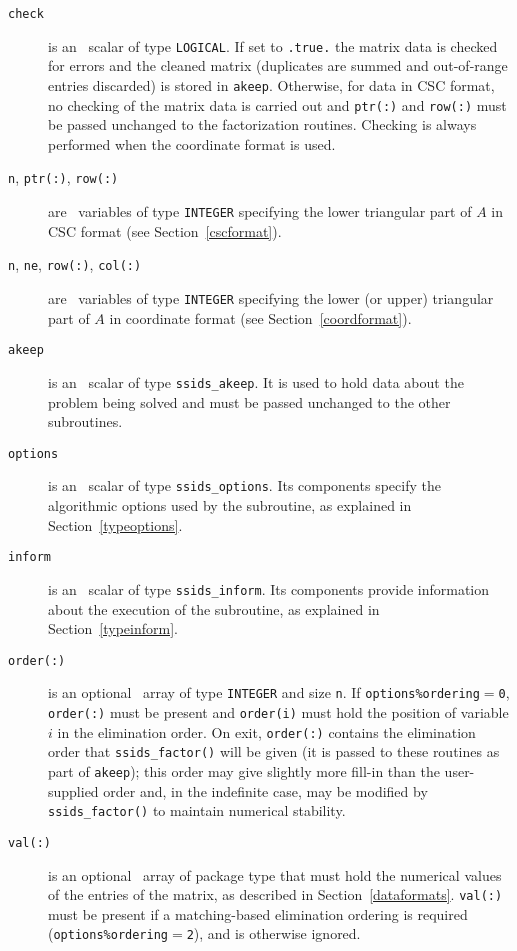 \vspace*{-3mm}
\begin{description}

\item[\texttt{check}] is an \intentin\ scalar of
type  {\tt LOGICAL}. If set to {\tt .true.} the matrix
data is checked for errors and the cleaned matrix
(duplicates are summed and out-of-range entries
discarded) is stored in {\tt akeep}.
Otherwise, for data in CSC format, no checking of the matrix data is carried out
and {\tt ptr(:)} and {\tt row(:)} must be passed unchanged to the factorization routines. 
Checking is always performed when the coordinate format is used.

\item[\texttt{n}{\rm ,} \texttt{ptr(:)}{\rm ,} \texttt{row(:)}] are \intentin\ 
   variables of type {\tt INTEGER} specifying the lower triangular part of $A$
   in CSC format (see Section~\ref{cscformat}).

\item[\texttt{n}{\rm ,} \texttt{ne}{\rm ,} \texttt{row(:)}{\rm ,} \texttt{col(:)}]
   are \intentin\ variables of type {\tt INTEGER} specifying the lower
   (or upper) triangular part of $A$ in coordinate format (see Section~\ref{coordformat}).

\item[\texttt{akeep}] is an \intentout\ scalar of type
{\tt ssids\_akeep}. It is used to hold data about the problem being
solved and must be passed unchanged to the other subroutines.

\item[\texttt{options}] is an \intentin\ scalar of type {\tt ssids\_options}.
Its components specify the algorithmic options used by the subroutine, as
explained in Section~\ref{typeoptions}.

\item[\texttt{inform}] is an \intentout\ scalar of type
{\tt ssids\_inform}. Its components provide information about the execution
of the subroutine, as explained in Section~\ref{typeinform}.

\item[\texttt{order(:)}] is an optional \intentinout\ array of type
{\tt INTEGER} and size {\tt n}. If {\tt options\%ordering}$=${\tt 0},
{\tt order(:)} must be present and {\tt order(i)} must hold the  position of
variable $i$  in the elimination order. On exit, {\tt order(:)} contains the
elimination order that {\tt ssids\_factor()} will be given (it is passed to these
routines as part of {\tt akeep}); this order may give slightly more fill-in
than the user-supplied order and, in the indefinite case, may be modified by
{\tt ssids\_factor()} to maintain numerical stability. 

\item[\texttt{val(:)}] is an optional \intentin\ array of package type that must
hold the numerical values of the entries of the matrix, as described in
Section~\ref{dataformats}.
{\tt val(:)} must be present if a matching-based elimination ordering is
required ({\tt options\%ordering$=$2}), and is otherwise ignored.

\end{description}


